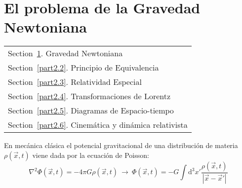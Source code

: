 \documentclass[../main]{subfiles}
\begin{document}
\section{El problema de la Gravedad Newtoniana}\label{part2.1}
        \begin{margintable}\vspace{.8in}\footnotesize
		\begin{tabularx}{\marginparwidth}{|X}
		  Section~\ref{part2.1}. Gravedad Newtoniana\\
            Section~\ref{part2.2}. Principio de Equivalencia \\
            Section~\ref{part2.3}. Relatividad Especial\\
            Section~\ref{part2.4}. Transformaciones de Lorentz\\
            Section~\ref{part2.5}. Diagramas de Espacio-tiempo\\
            Section~\ref{part2.6}. Cinemática y dinámica relativista\\
		\end{tabularx}
	\end{margintable}
 
En mecánica clásica el potencial gravitacional de una distribución de materia $\rho(\vec{x}, t)$ viene dada por la ecuación de Poisson:
\begin{equation}
    \nabla^2 \Phi(\vec{x}, t)=-4\pi G\rho(\vec{x}, t) \ \rightarrow \ \Phi(\vec{x}, t)=-G \int \mathrm{d}^3 x' \dfrac{\rho(\vec{x}, t)}{|\vec{x}-\vec{x}'|}
\end{equation}
\end{document}
